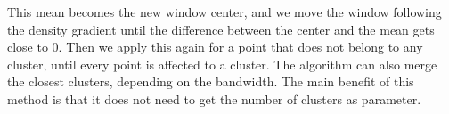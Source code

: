 This mean becomes the new window center, and we move the window following the density gradient until the difference between the center and the mean gets close to 0.
Then we apply this again for a point that does not belong to any cluster, until every point is affected to a cluster. The algorithm can also merge the closest clusters, depending on the bandwidth.
The main benefit of this method is that it does not need to get the number of clusters as parameter.

